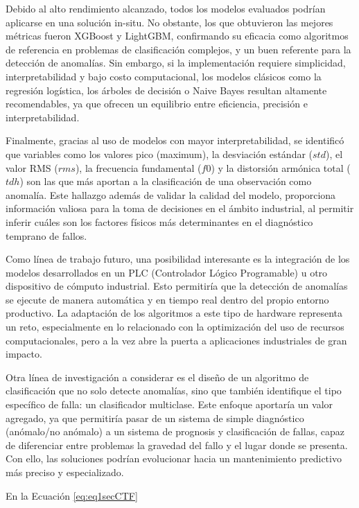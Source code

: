 \documentclass[11pt,a4paper,spanish]{book}
\numberwithin{equation}{chapter}
\numberwithin{figure}{chapter}
\begin{document}
Debido al alto rendimiento alcanzado, todos los modelos evaluados podrían aplicarse en 
una solución in-situ. No obstante, los que obtuvieron las mejores métricas fueron 
XGBoost y LightGBM, confirmando su eficacia como algoritmos de referencia en problemas
de clasificación complejos, y un buen referente para la detección de anomalías. Sin 
embargo, si la implementación requiere simplicidad, interpretabilidad y bajo costo 
computacional, los modelos clásicos como la regresión logística, los árboles de decisión
o Naive Bayes resultan altamente recomendables, ya que ofrecen un equilibrio entre 
eficiencia, precisión e interpretabilidad.


Finalmente, gracias al uso de modelos con mayor interpretabilidad, se identificó que 
variables como los valores pico (maximum), la desviación estándar ($std$), el valor RMS ($rms$),
la frecuencia fundamental ($f0$) y la distorsión armónica total ($tdh$) son las que más 
aportan a la clasificación de una observación como anomalía. Este hallazgo  además de 
validar la calidad del modelo, proporciona información valiosa para la toma de 
decisiones en el ámbito industrial, al permitir inferir cuáles son los factores físicos
más determinantes en el diagnóstico temprano de fallos.


Como línea de trabajo futuro, una posibilidad interesante es la integración de los 
modelos desarrollados en un PLC (Controlador Lógico Programable) u otro dispositivo
de cómputo industrial. Esto permitiría que la detección de anomalías se ejecute de 
manera automática y en tiempo real dentro del propio entorno productivo. La adaptación
de los algoritmos a este tipo de hardware representa un reto, especialmente en lo 
relacionado con la optimización del uso de recursos computacionales, pero a la vez abre
la puerta a aplicaciones industriales de gran impacto.


Otra línea de investigación a considerar es el diseño de un algoritmo de clasificación
que no solo detecte anomalías, sino que también identifique el tipo específico de falla:
un clasificador multiclase.  Este enfoque aportaría un valor agregado, ya que permitiría
pasar de un sistema de simple diagnóstico (anómalo/no anómalo) a un sistema de prognosis
y clasificación de fallas, capaz de diferenciar entre problemas la gravedad del fallo y 
el lugar donde se presenta. Con ello, las soluciones podrían evolucionar hacia un 
mantenimiento predictivo más preciso y especializado.


En la Ecuación \eqref{eq:eq1secCTF}
\end{document}
